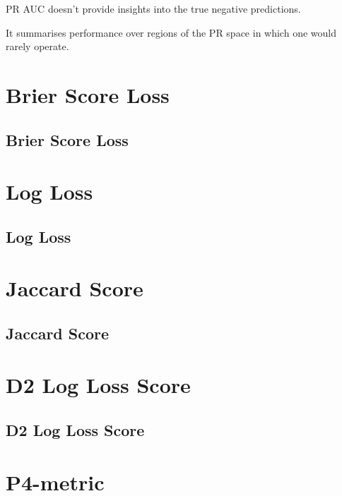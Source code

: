 {
\item PR AUC doesn't provide insights into the true negative predictions.
\item It summarises performance over regions of the PR space in which one would rarely operate.
}


\clearpage
\thispagestyle{classificationstyle}
\section{Brier Score Loss}
\subsection{Brier Score Loss}

\clearpage
\thispagestyle{classificationstyle}
\section{Log Loss}
\subsection{Log Loss}

\clearpage
\thispagestyle{classificationstyle}
\section{Jaccard Score}
\subsection{Jaccard Score}

\clearpage
\thispagestyle{classificationstyle}
\section{D2 Log Loss Score}
\subsection{D2 Log Loss Score}

\clearpage
\thispagestyle{classificationstyle}
\section{P4-metric}
